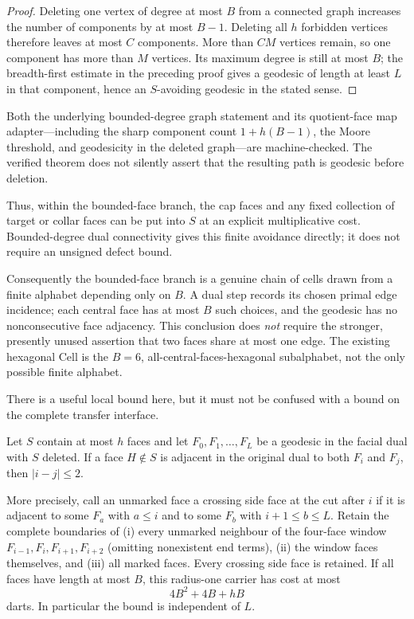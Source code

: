 \begin{proof}
Deleting one vertex of degree at most $B$ from a connected graph increases
the number of components by at most $B-1$.  Deleting all $h$ forbidden
vertices therefore leaves at most $C$ components.  More than $CM$ vertices
remain, so one component has more than $M$ vertices.  Its maximum degree is
still at most $B$; the breadth-first estimate in the preceding proof gives a
geodesic of length at least $L$ in that component, hence an $S$-avoiding
geodesic in the stated sense.
\end{proof}

Both the underlying bounded-degree graph statement and its quotient-face map
adapter---including the sharp component count $1+h(B-1)$, the Moore threshold,
and geodesicity in the deleted graph---are machine-checked.
The verified theorem does not silently assert that the resulting path is
geodesic before deletion.

Thus, within the bounded-face branch, the cap faces and any fixed collection
of target or collar faces can be put into $S$ at an explicit multiplicative
cost.  Bounded-degree dual connectivity gives this finite avoidance directly;
it does not require an unsigned defect bound.

Consequently the bounded-face branch is a genuine chain of cells drawn from
a finite alphabet depending only on $B$.  A dual step records its chosen
primal edge incidence; each central face has at most $B$ such choices, and
the geodesic has no nonconsecutive face adjacency.  This conclusion does
\emph{not} require the stronger, presently unused assertion that two faces
share at most one edge.  The existing hexagonal Cell is the $B=6$,
all-central-faces-hexagonal subalphabet, not the only possible finite
alphabet.

There is a useful local bound here, but it must not be confused with a bound
on the complete transfer interface.

\begin{lemma}
\label{lem:geodesic-locality}
Let $S$ contain at most $h$ faces and let
$F_0,F_1,\ldots,F_L$ be a geodesic in the facial dual with $S$ deleted.
If a face $H\notin S$ is adjacent in the original dual to both $F_i$ and
$F_j$, then $|i-j|\le2$.

More precisely, call an unmarked face a crossing side face at the cut after
$i$ if it is adjacent to some $F_a$ with $a\le i$ and to some $F_b$ with
$i+1\le b\le L$.  Retain the complete boundaries of (i) every unmarked
neighbour of the four-face window
$F_{i-1},F_i,F_{i+1},F_{i+2}$ (omitting nonexistent end terms), (ii) the
window faces themselves, and (iii) all marked faces.  Every crossing side
face is retained.  If all faces have length at most $B$, this radius-one
carrier has cost at most
\[
                         4B^2+4B+hB
\]
darts.  In particular the bound is independent of $L$.
\end{lemma}

